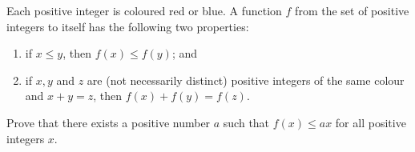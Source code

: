 Each positive integer is coloured red or blue. A function $f$ from the set of positive integers to itself has the following two properties:
\begin{enumerate}[label=(\alph*)]
	\item if $x\le y$, then $f(x)\le f(y)$; and
	\item if $x,y$ and $z$ are (not necessarily distinct) positive integers of the same colour and $x+y=z$, then $f(x)+f(y)=f(z)$.
\end{enumerate}

Prove that there exists a positive number $a$ such that $f(x)\le ax$ for all positive integers $x$.